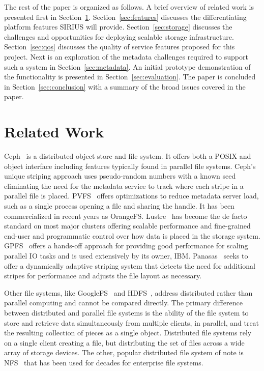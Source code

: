\documentclass[letterpaper,twocolumn,10pt]{article}
\begin{document}
The rest of the paper is organized as follows. A brief overview of related work
is presented first in Section~\ref{sec:related}. Section~\ref{sec:features}
discusses the differentiating platform features SIRIUS will provide.
Section~\ref{sec:storage}
discusses the challenges and opportunities for deploying scalable storage
infrastructure.
Section~\ref{sec:qos}
discusses the quality of service features proposed for this project.
Next is an exploration of the metadata challenges required to support such a
system in Section~\ref{sec:metadata}.
An initial prototype demonstration of the functionality is presented in
Section~\ref{sec:evaluation}.
The paper is concluded in
Section~\ref{sec:conclusion} with a summary of the broad issues covered in the
paper.


\section{Related Work}
\label{sec:related}

Ceph~\cite{weil:ceph} is a distributed object store and file system. It offers
both a POSIX and object interface including features typically found in
parallel file systems.  Ceph's unique striping approach uses pseudo-random
numbers with a known seed eliminating the need for the metadata service to
track where each stripe in a parallel file is placed.  PVFS~\cite{carns:pvfs}
offers optimizations to reduce metadata server load, such as a single process
opening a file and sharing the handle.  It has been commercialized in recent
years as OrangeFS.  Lustre~\cite{braam:lustre-arch} has become the de facto
standard on most major clusters offering scalable performance and fine-grained
end-user and programmatic control over how data is placed in the storage
system.  GPFS~\cite{schmuck:gpfs} offers a hands-off approach for providing
good performance for scaling parallel IO tasks and is used extensively by its
owner, IBM.  Panasas~\cite{panasas:architecture} seeks to offer a dynamically
adaptive striping system that detects the need for additional stripes for
performance and adjusts the file layout as necessary.

Other file systems, like GoogleFS~\cite{ghemawat:googlefs} and
HDFS~\cite{Shvachko:2010:hdfs}, address distributed rather than parallel
computing and cannot be compared directly.  The primary difference between
distributed and parallel file systems is the ability of the file system to
store and retrieve data simultaneously from multiple clients, in parallel, and
treat the resulting collection of pieces as a single object.  Distributed file
systems rely on a single client creating a file, but distributing the set of
files across a wide array of storage devices.  The other, popular distributed
file system of note is NFS~\cite{powlowski:1994:nfs3} that has been used for
decades for enterprise file systems.
\end{document}
